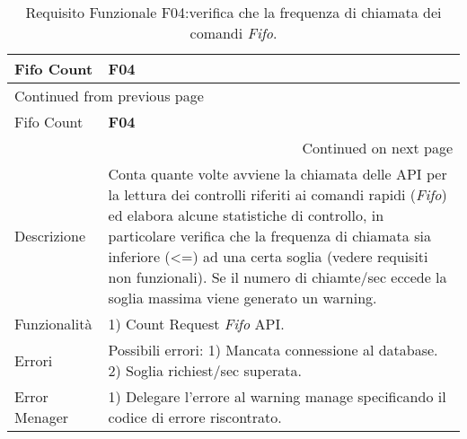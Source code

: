 \documentclass[onecolumn,a4paper]{article}
\begin{document}
\begin{longtable}{|p{3cm}|p{10cm}|}
\caption{Requisito Funzionale F04:verifica che la frequenza di chiamata dei comandi \emph{Fifo}.}
\\
\cellcolor{grey!15}Fifo Count & \cellcolor{grey!15} \textbf{F04}\\
\hline
\endfirsthead
\multicolumn{2}{l}{Continued from previous page} \\
\hline

\cellcolor{grey!15}Fifo Count & \cellcolor{grey!15} \textbf{F04} \\

\hline
\endhead
\hline\multicolumn{2}{r}{Continued on next page} \\
\endfoot
\endlastfoot
\hline
Descrizione & Conta quante volte avviene la chiamata delle API per la lettura dei controlli riferiti ai comandi rapidi (\emph{Fifo}) ed elabora alcune statistiche di controllo, in particolare verifica che la frequenza di chiamata sia inferiore (<=) ad una certa soglia (vedere requisiti non funzionali). Se il numero di chiamte/sec eccede la soglia massima viene generato un warning.\\
\hline
Funzionalità & 1) Count Request \emph{Fifo} API.\\
\hline
Errori & Possibili errori: 1) Mancata connessione al database. 2) Soglia richiest/sec superata.\\
\hline
Error Menager & 1) Delegare l'errore al warning manage specificando il codice di errore riscontrato.\\
\hline
\end{longtable}
\end{document}

